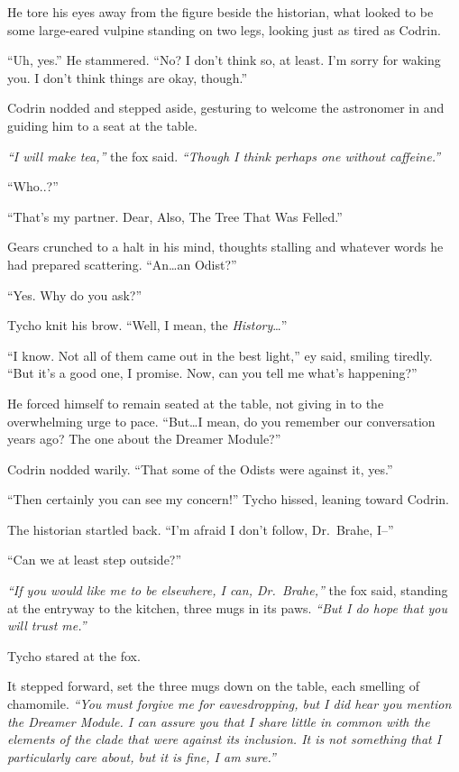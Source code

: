 He tore his eyes away from the figure beside the historian, what looked to be some large-eared vulpine standing on two legs, looking just as tired as Codrin.

``Uh, yes.'' He stammered. ``No? I don't think so, at least. I'm sorry for waking you. I don't think things are okay, though.''

Codrin nodded and stepped aside, gesturing to welcome the astronomer in and guiding him to a seat at the table.

\emph{``I will make tea,''} the fox said. \emph{``Though I think perhaps one without caffeine.''}

``Who..?''

``That's my partner. Dear, Also, The Tree That Was Felled.''

Gears crunched to a halt in his mind, thoughts stalling and whatever words he had prepared scattering. ``An\ldots an Odist?''

``Yes. Why do you ask?''

Tycho knit his brow. ``Well, I mean, the \emph{History}\ldots{}''

``I know. Not all of them came out in the best light,'' ey said, smiling tiredly. ``But it's a good one, I promise. Now, can you tell me what's happening?''

He forced himself to remain seated at the table, not giving in to the overwhelming urge to pace. ``But\ldots I mean, do you remember our conversation years ago? The one about the Dreamer Module?''

Codrin nodded warily. ``That some of the Odists were against it, yes.''

``Then certainly you can see my concern!'' Tycho hissed, leaning toward Codrin.

The historian startled back. ``I'm afraid I don't follow, Dr.~Brahe, I--''

``Can we at least step outside?''

\emph{``If you would like me to be elsewhere, I can, Dr.~Brahe,''} the fox said, standing at the entryway to the kitchen, three mugs in its paws. \emph{``But I do hope that you will trust me.''}

Tycho stared at the fox.

It stepped forward, set the three mugs down on the table, each smelling of chamomile. \emph{``You must forgive me for eavesdropping, but I did hear you mention the Dreamer Module. I can assure you that I share little in common with the elements of the clade that were against its inclusion. It is not something that I particularly care about, but it is fine, I am sure.''}

